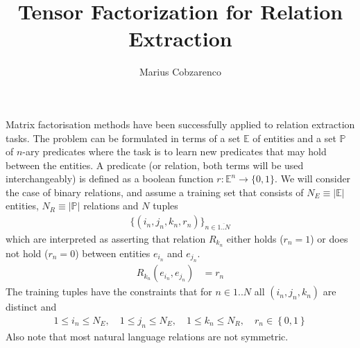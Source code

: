 \documentclass[a4paper, 12pt, fleqn]{article}
\begin{document}
 \title{Tensor Factorization for Relation Extraction}
\author{Marius Cobzarenco}
\maketitle


Matrix factorisation methods have been successfully applied to
relation extraction tasks. The problem can be formulated in terms of a
set $\mathbb{E}$ of entities and a set $\mathbb{P}$ of $n$-ary
predicates where the task is to learn new predicates that may hold
between the entities. A predicate (or relation, both terms will be
used interchangeably) is defined as a boolean function $r:\mathbb{E}^n
\rightarrow \{0, 1\}$. We will consider the case of binary relations,
and assume a training set that consists of $ N_E \equiv
\vert\mathbb{E}\vert$ entities, $N_R \equiv \vert\mathbb{P}\vert$
relations and $N$ tuples
\begin{align}
\{(i_n, j_n, k_n, r_n)\}_{n\in\overline{1..N}}
\end{align}
which are interpreted as asserting that relation $R_{k_n}$ either
holds ($r_n = 1$) or does not hold ($r_n = 0$) between entities
$e_{i_n}$ and $e_{j_n}$.
\begin{align}
R_{k_n}(e_{i_n}, e_{j_n}) &= r_n
\end{align}
The training tuples have the constraints that for $n\in{1..N}$ all
$(i_n, j_n, k_n)$ are distinct and
\begin{align}
1 \leq i_n \leq N_E, \quad 1 \leq j_n \leq N_E, \quad
1 \leq k_n \leq N_R,\quad r_n \in \left\{0, 1\right\}
\end{align}
Also note that most natural language relations are not symmetric.
\end{document}
